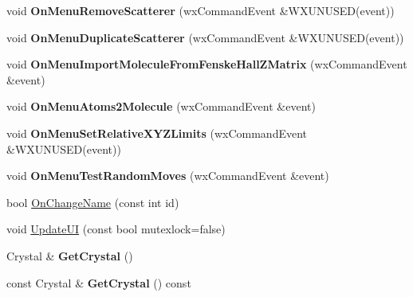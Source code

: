 \begin{DoxyCompactItemize}
\mbox{\label{class_obj_cryst_1_1_w_x_crystal_a3e0d4ba6153c064ee7adf90f58718448}} 
void {\bfseries On\+Menu\+Remove\+Scatterer} (wx\+Command\+Event \&W\+X\+U\+N\+U\+S\+ED(event))
\item 
\mbox{\label{class_obj_cryst_1_1_w_x_crystal_aab02a7fb32d2e10fa4070abd94a566e8}} 
void {\bfseries On\+Menu\+Duplicate\+Scatterer} (wx\+Command\+Event \&W\+X\+U\+N\+U\+S\+ED(event))
\item 
\mbox{\label{class_obj_cryst_1_1_w_x_crystal_ac07540c36d5d22ddb92bf8a3baf0d0cf}} 
void {\bfseries On\+Menu\+Import\+Molecule\+From\+Fenske\+Hall\+Z\+Matrix} (wx\+Command\+Event \&event)
\item 
\mbox{\label{class_obj_cryst_1_1_w_x_crystal_a7a75a3369ac7fddcff066e916819db45}} 
void {\bfseries On\+Menu\+Atoms2\+Molecule} (wx\+Command\+Event \&event)
\item 
\mbox{\label{class_obj_cryst_1_1_w_x_crystal_acc56021ce6c9cc37fed3b640d66a47f0}} 
void {\bfseries On\+Menu\+Set\+Relative\+X\+Y\+Z\+Limits} (wx\+Command\+Event \&W\+X\+U\+N\+U\+S\+ED(event))
\item 
\mbox{\label{class_obj_cryst_1_1_w_x_crystal_a76ee9b2376daa9712be7d2ad3c99fcbf}} 
void {\bfseries On\+Menu\+Test\+Random\+Moves} (wx\+Command\+Event \&event)
\item 
bool \mbox{\hyperlink{class_obj_cryst_1_1_w_x_crystal_a7a15c2d1b5f5997ace336724fc396892}{On\+Change\+Name}} (const int id)
\item 
void \mbox{\hyperlink{class_obj_cryst_1_1_w_x_crystal_a62946717943682dc2ac07ea4584030f4}{Update\+UI}} (const bool mutexlock=false)
\item 
\mbox{\label{class_obj_cryst_1_1_w_x_crystal_a14854b7cc30249f334cc6790885d0a24}} 
Crystal \& {\bfseries Get\+Crystal} ()
\item 
\mbox{\label{class_obj_cryst_1_1_w_x_crystal_a2fd626ca24c93163a10b49fc7eccb6e6}} 
const Crystal \& {\bfseries Get\+Crystal} () const

\end{DoxyCompactItemize}

